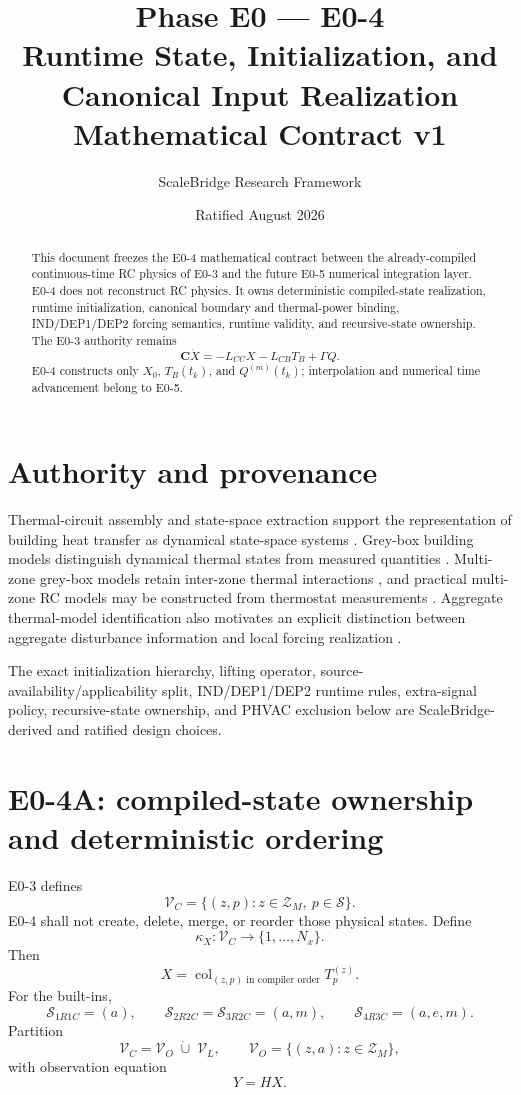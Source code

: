 \documentclass[11pt]{article}
\title{\SB{} Phase E0 --- E0-4\\Runtime State, Initialization, and Canonical Input Realization\\Mathematical Contract v1}
\author{ScaleBridge Research Framework}
\date{Ratified August 2026}
\newcommand{\Zset}{\mathcal{Z}_M}
\newcommand{\Vobs}{\mathcal{V}_O}
\newcommand{\Vlat}{\mathcal{V}_L}
\newcommand{\Vcap}{\mathcal{V}_C}
\begin{document}
\maketitle

\begin{abstract}
This document freezes the E0-4 mathematical contract between the already-compiled
continuous-time RC physics of E0-3 and the future E0-5 numerical integration layer.
E0-4 does not reconstruct RC physics. It owns deterministic compiled-state realization,
runtime initialization, canonical boundary and thermal-power binding, IND/DEP1/DEP2
forcing semantics, runtime validity, and recursive-state ownership. The E0-3 authority remains
\[
\mathbf C\dot X=-L_{CC}X-L_{CB}T_B+\Gamma Q.
\]
E0-4 constructs only \(X_0\), \(T_B(t_k)\), and \(Q^{(m)}(t_k)\); interpolation and numerical
time advancement belong to E0-5.
\end{abstract}

\section{Authority and provenance}
Thermal-circuit assembly and state-space extraction support the representation of building
heat transfer as dynamical state-space systems \cite{GhiausAhmad2020ThermalCircuits}.
Grey-box building models distinguish dynamical thermal states from measured quantities
\cite{BacherMadsen2011HeatDynamics}. Multi-zone grey-box models retain inter-zone
thermal interactions \cite{ArroyoSpiessensHelsen2020MultiZone}, and practical multi-zone
RC models may be constructed from thermostat measurements
\cite{VallianosAthienitisDelcroix2022MultiZoneRC}. Aggregate thermal-model identification
also motivates an explicit distinction between aggregate disturbance information and local
forcing realization \cite{GuoEtAl2021AggregateDisturbance}.

The exact initialization hierarchy, lifting operator, source-availability/applicability split,
IND/DEP1/DEP2 runtime rules, extra-signal policy, recursive-state ownership, and PHVAC
exclusion below are ScaleBridge-derived and ratified design choices.

\section{E0-4A: compiled-state ownership and deterministic ordering}
E0-3 defines
\[
\Vcap=\{(z,p):z\in\Zset,\ p\in\mathcal S\}.
\]
E0-4 shall not create, delete, merge, or reorder those physical states. Define
\[
\boxed{\kappa_X:\Vcap\rightarrow\{1,\ldots,N_x\}}.
\]
Then
\[
\boxed{X=\operatorname{col}_{(z,p)\text{ in compiler order}}T_p^{(z)}}.
\]
For the built-ins,
\[
\mathcal S_{1R1C}=(a),\qquad
\mathcal S_{2R2C}=\mathcal S_{3R2C}=(a,m),\qquad
\mathcal S_{4R3C}=(a,e,m).
\]
Partition
\[
\boxed{\Vcap=\Vobs\;\dot\cup\;\Vlat},\qquad
\Vobs=\{(z,a):z\in\Zset\},
\]
with observation equation
\[
\boxed{Y=HX}.
\]
\end{document}
